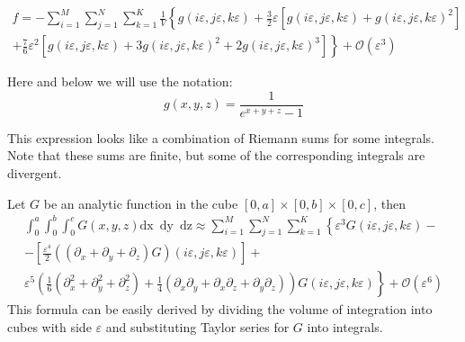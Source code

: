\documentclass{article}
\newcommand{\dx}{\mathrm{dx}~}
\newcommand{\dy}{\mathrm{dy}~}
\newcommand{\dz}{\mathrm{dz}}
\begin{document}
\begin{multline}
  \label{eq:4}
  f=- \sum_{i=1}^{M} \sum_{j=1}^{N} \sum_{k=1}^{K} \frac{1}{V}\left\{
    g(i\varepsilon,j\varepsilon,k\varepsilon)+
    \frac{3}{2}\varepsilon\left[g(i\varepsilon,j\varepsilon,k\varepsilon)+g(i\varepsilon,j\varepsilon,k\varepsilon)^{2}\right]\right.\\
  \left.+\frac{7}{6}\varepsilon^{2}\left[g(i\varepsilon,j\varepsilon,k\varepsilon)+3 g(i\varepsilon,j\varepsilon,k\varepsilon)^{2}+
      2 g(i\varepsilon,j\varepsilon,k\varepsilon)^{3}\right]\right\}  + \mathcal{O}(\varepsilon^{3})
\end{multline}

Here and below we will use the notation:
\begin{equation}
  \label{eq:5}
  g(x,y,z)=\frac{1}{e^{x+y+z}-1}
\end{equation}

This expression looks like a combination of Riemann sums for some integrals. Note that these sums
are finite, but some of the corresponding integrals are divergent.


Let $G$ be an analytic function in the cube $[0,a]\times[0,b]\times[0,c]$, then
\begin{multline}
  \label{eq:21}
  \int_{0}^{a} \int_{0}^{b}\int_{0}^{c}G(x,y,z) \dx\; \dy\;
  \dz\approx\sum_{i=1}^{M}\sum_{j=1}^{N}\sum_{k=1}^{K}\left\{\varepsilon^{3}G\left(i\varepsilon,j\varepsilon,k\varepsilon\right)-\right.\\
  \left.-\left[\frac{\varepsilon^{4}}{2}\left((\partial_{x}+\partial_{y}+\partial_{z})G\right)(i\varepsilon,j\varepsilon,k\varepsilon)\right]+\right.\\
  \left.\varepsilon^{5}\left(\frac{1}{6}(\partial_{x}^{2}+\partial_{y}^{2}+\partial_{z}^{2})+\frac{1}{4}(\partial_{x}\partial_{y}+\partial_{x}\partial_{z}+\partial_{y}\partial_{z})\right)G\left(i\varepsilon,j\varepsilon,k\varepsilon\right)
  \right\}+\mathcal{O}(\varepsilon^{6})
\end{multline}
This formula can be easily derived by dividing the volume of integration into cubes with side
$\varepsilon$ and substituting Taylor series for $G$ into integrals.
\end{document}
